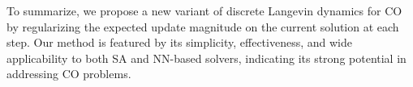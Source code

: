 To summarize, we propose a new variant of discrete Langevin dynamics for CO by regularizing the expected update magnitude on the current solution at each step. Our method is featured by its simplicity, effectiveness, and wide applicability to both SA and NN-based solvers, indicating its strong potential in addressing CO problems.





